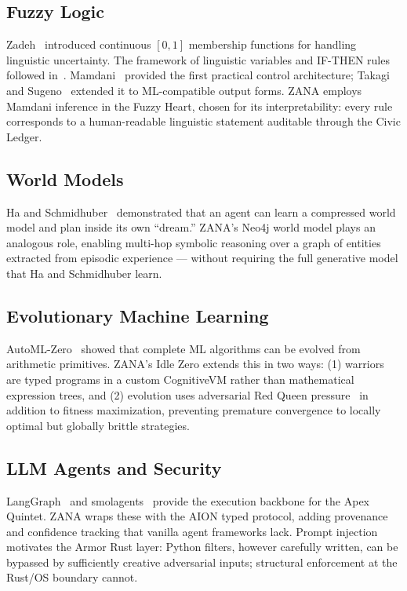 \documentclass[12pt,a4paper]{article}
\begin{document}
\subsection{Fuzzy Logic}
Zadeh~\cite{zadeh1965fuzzysets} introduced continuous $[0,1]$ membership functions for
handling linguistic uncertainty. The framework of linguistic variables and IF-THEN rules
followed in~\cite{zadeh1973outline,zadeh1975fuzzylogic}. Mamdani~\cite{mamdani1974application}
provided the first practical control architecture; Takagi and Sugeno~\cite{takagi1985fuzzy}
extended it to ML-compatible output forms. ZANA employs Mamdani inference in the Fuzzy Heart,
chosen for its interpretability: every rule corresponds to a human-readable linguistic
statement auditable through the Civic Ledger.

\subsection{World Models}
Ha and Schmidhuber~\cite{ha2018worldmodels} demonstrated that an agent can learn a compressed
world model and plan inside its own ``dream.'' ZANA's Neo4j world model plays an analogous
role, enabling multi-hop symbolic reasoning over a graph of entities extracted from episodic
experience --- without requiring the full generative model that Ha and Schmidhuber learn.

\subsection{Evolutionary Machine Learning}
AutoML-Zero~\cite{real2020automlzero} showed that complete ML algorithms can be evolved from
arithmetic primitives. ZANA's Idle Zero extends this in two ways: (1) warriors are typed
programs in a custom CognitiveVM rather than mathematical expression trees, and (2) evolution
uses adversarial Red Queen pressure~\cite{kumar2025redqueen} in addition to fitness
maximization, preventing premature convergence to locally optimal but globally brittle
strategies.

\subsection{LLM Agents and Security}
LangGraph~\cite{langchain2024langgraph} and smolagents~\cite{huggingface2024smolagents}
provide the execution backbone for the Apex Quintet. ZANA wraps these with the AION typed
protocol, adding provenance and confidence tracking that vanilla agent frameworks lack.
Prompt injection~\cite{greshake2023promptinjection} motivates the Armor Rust layer: Python
filters, however carefully written, can be bypassed by sufficiently creative adversarial
inputs; structural enforcement at the Rust/OS boundary cannot.
\end{document}

